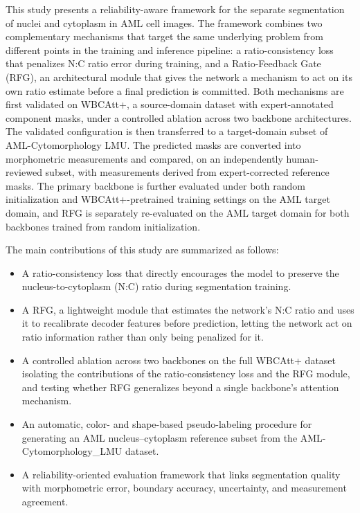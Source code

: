 \documentclass[pdflatex,sn-mathphys-num]{sn-jnl}%
\theoremstyle{thmstyleone}%
\theoremstyle{thmstyletwo}%
\theoremstyle{thmstylethree}%
\begin{document}
This study presents a reliability-aware framework for the separate segmentation of nuclei and cytoplasm in AML cell images. The framework combines two complementary mechanisms that target the same underlying problem from different points in the training and inference pipeline: a ratio-consistency loss that penalizes N:C ratio error during training, and a Ratio-Feedback Gate (RFG), an architectural module that gives the network a mechanism to act on its own ratio estimate before a final prediction is committed. Both mechanisms are first validated on WBCAtt+, a source-domain dataset with expert-annotated component masks, under a controlled ablation across two backbone architectures. The validated configuration is then transferred to a target-domain subset of AML-Cytomorphology LMU. The predicted masks are converted into morphometric measurements and compared, on an independently human-reviewed subset, with measurements derived from expert-corrected reference masks. The primary backbone is further evaluated under both random initialization and WBCAtt+-pretrained training settings on the AML target domain, and RFG is separately re-evaluated on the AML target domain for both backbones trained from random initialization.

The main contributions of this study are summarized as follows:

\begin{itemize} 
    \item A ratio-consistency loss that directly encourages the model to preserve the nucleus-to-cytoplasm (N:C) ratio during segmentation training.
    \item A RFG, a lightweight module that estimates the network's N:C ratio and uses it to recalibrate decoder features before prediction, letting the network act on ratio information rather than only being penalized for it.
    \item A controlled ablation across two backbones on the full WBCAtt+ dataset isolating the contributions of the ratio-consistency loss and the RFG module, and testing whether RFG generalizes beyond a single backbone's attention mechanism. 
    \item An automatic, color- and shape-based pseudo-labeling procedure for generating an AML nucleus--cytoplasm reference subset from the AML-Cytomorphology\_LMU dataset. 
    \item A reliability-oriented evaluation framework that links segmentation quality with morphometric error, boundary accuracy, uncertainty, and measurement agreement. 
\end{itemize}
\end{document}
